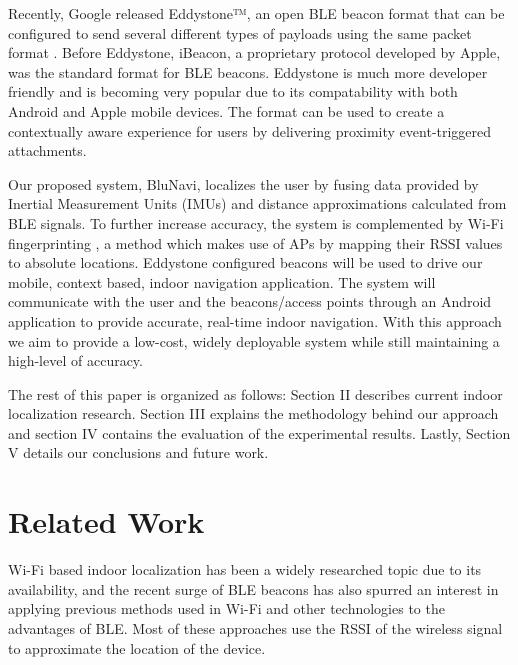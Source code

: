 \documentclass[conference]{IEEEtran}
\begin{document}
Recently, Google released Eddystone™, an open BLE beacon format that can be configured to send several different types of payloads using the same packet format \cite{developers.google.com}. Before Eddystone, iBeacon, a proprietary protocol developed by Apple, was the standard format for BLE beacons. Eddystone is much more developer friendly and is becoming very popular due to its compatability with both Android and Apple mobile devices. The format can be used to create a contextually aware experience for users by delivering proximity event-triggered attachments.

Our proposed system, BluNavi, localizes the user by fusing data provided by Inertial Measurement Units (IMUs) and distance approximations calculated from BLE signals. To further increase accuracy, the system is complemented by Wi-Fi fingerprinting , a method which makes use of APs by mapping their RSSI values to absolute locations. Eddystone configured beacons will be used to drive our mobile, context based, indoor navigation application. The system will communicate with the user and the beacons/access points through an Android application to provide accurate, real-time indoor navigation. With this approach we aim to provide a low-cost, widely deployable system while still maintaining  a high-level of accuracy.

The rest of this paper is organized as follows: Section II describes current indoor localization research. Section III explains the methodology behind our approach and section IV contains the evaluation of the experimental results. Lastly, Section V details our conclusions and future work.


\section{Related Work}
Wi-Fi based indoor localization has been a widely researched topic due to its availability, and the recent surge of BLE beacons has also spurred an interest in applying previous methods used in Wi-Fi and other technologies to the advantages of BLE. Most of these approaches use the RSSI of the wireless signal to approximate the location of the device.
\end{document}
